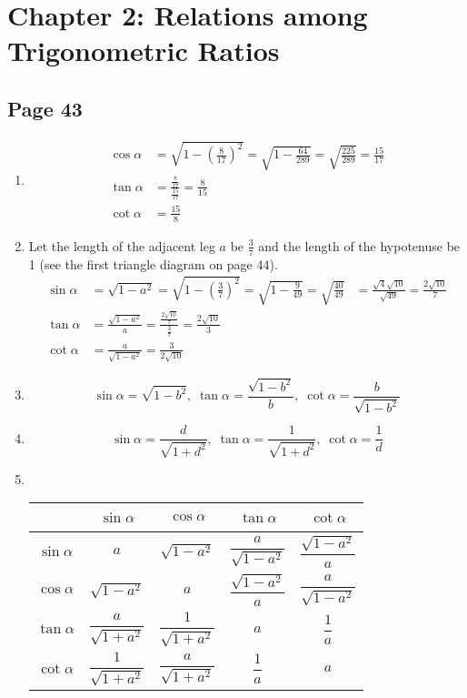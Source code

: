 \documentclass{article}
\newenvironment{solutions}[1]
{\subsection*{#1}
 \begin{enumerate}[leftmargin=1.5em]}
{\end{enumerate}}
\newcommand{\solution}{\item}
\begin{document}
\section*{Chapter 2: Relations among Trigonometric Ratios}

\begin{solutions}{Page 43}
\solution %
\begin{align*}
\cos{\alpha} &= \sqrt{1 - \left(\frac{8}{17}\right)^2} = \sqrt{1 - \frac{64}{289}} = \sqrt{\frac{225}{289}} = \frac{15}{17} \\
\tan{\alpha} &= \frac{\frac{8}{17}}{\frac{15}{17}} = \frac{8}{15} \\
\cot{\alpha} &= \frac{15}{8}
\end{align*}

\solution %
Let the length of the adjacent leg $a$ be $\frac{3}{7}$ and the length of the hypotenuse be 1 (see the first triangle diagram on page 44).
\begin{align*}
\sin{\alpha} &= \sqrt{1 - a^2} = \sqrt{1 - \left(\frac{3}{7}\right)^2} = \sqrt{1 - \frac{9}{49}} = \sqrt{\frac{40}{49}} &= \frac{\sqrt{4}\sqrt{10}}{\sqrt{49}} = \frac{2\sqrt{10}}{7} \\
\tan{\alpha} &= \frac{\sqrt{1 - a^2}}{a} = \frac{\frac{2\sqrt{10}}{7}}{\frac{3}{7}} = \frac{2\sqrt{10}}{3} \\
\cot{\alpha} &= \frac{a}{\sqrt{1 - a^2}} = \frac{3}{2\sqrt{10}}
\end{align*}

\solution %
\begin{equation*}
\sin{\alpha} = \sqrt{1 - b^2},\;
\tan{\alpha} = \frac{\sqrt{1 - b^2}}{b},\; 
\cot{\alpha} = \frac{b}{\sqrt{1 - b^2}}
\end{equation*}

\solution %
\begin{equation*}
\sin{\alpha} = \frac{d}{\sqrt{1 + d^2}},\;
\tan{\alpha} = \frac{1}{\sqrt{1 + d^2}},\; 
\cot{\alpha} = \frac{1}{d}
\end{equation*}

\solution ~ %
\begin{center}
\bgroup
\def\arraystretch{2.1}
\setlength\tabcolsep{15pt}
\begin{tabular}{ |c|c|c|c|c| }
\hline
~              & $\sin{\alpha}$             & $\cos{\alpha}$             & $\tan{\alpha}$             & $\cot{\alpha}$ \\
\hline
$\sin{\alpha}$ & $a$                        & $\sqrt{1 - a^2}$           & $\dfrac{a}{\sqrt{1 - a^2}}$ & $\dfrac{\sqrt{1 - a^2}}{a}$ \\
\hline
$\cos{\alpha}$ & $\sqrt{1 - a^2}$           & $a$                        & $\dfrac{\sqrt{1 - a^2}}{a}$ & $\dfrac{a}{\sqrt{1 - a^2}}$ \\
\hline
$\tan{\alpha}$ & $\dfrac{a}{\sqrt{1 + a^2}}$ & $\dfrac{1}{\sqrt{1 + a^2}}$ & $a$                       & $\dfrac{1}{a}$ \\
\hline
$\cot{\alpha}$ & $\dfrac{1}{\sqrt{1 + a^2}}$ & $\dfrac{a}{\sqrt{1 + a^2}}$ & $\dfrac{1}{a}$              & $a$ \\
\hline
\end{tabular}
\egroup
\end{center}



\end{solutions}
\end{document}
